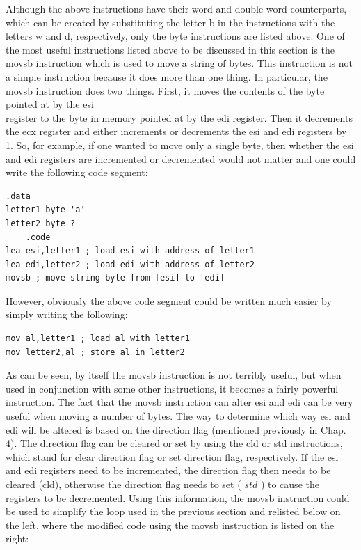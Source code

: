 \documentclass[10pt]{book}
\begin{document}
Although the above instructions have their word and double word counterparts, which can be created by substituting the letter b in the instructions with the letters w and d, respectively, only the byte instructions are listed above. One of the most useful instructions listed above to be discussed in this section is the movsb instruction which is used to move a string of bytes. This instruction is not a simple instruction because it does more than one thing. In particular, the movsb instruction does two things. First, it moves the contents of the byte pointed at by the esi\\
register to the byte in memory pointed at by the edi register. Then it decrements the ecx register and either increments or decrements the esi and edi registers by 1. So, for example, if one wanted to move only a single byte, then whether the esi and edi registers are incremented or decremented would not matter and one could write the following code segment:


\begin{verbatim}
.data
letter1 byte 'a'
letter2 byte ?
    .code
lea esi,letter1 ; load esi with address of letter1
lea edi,letter2 ; load edi with address of letter2
movsb ; move string byte from [esi] to [edi]
\end{verbatim}

However, obviously the above code segment could be written much easier by simply writing the following:

\begin{verbatim}
mov al,letter1 ; load al with letter1
mov letter2,al ; store al in letter2
\end{verbatim}

As can be seen, by itself the movsb instruction is not terribly useful, but when used in conjunction with some other instructions, it becomes a fairly powerful instruction. The fact that the movsb instruction can alter esi and edi can be very useful when moving a number of bytes. The way to determine which way esi and edi will be altered is based on the direction flag (mentioned previously in Chap. 4). The direction flag can be cleared or set by using the cld or std instructions, which stand for clear direction flag or set direction flag, respectively. If the esi and edi registers need to be incremented, the direction flag then needs to be cleared (cld), otherwise the direction flag needs to set ( $s t d$ ) to cause the registers to be decremented. Using this information, the movsb instruction could be used to simplify the loop used in the previous section and relisted below on the left, where the modified code using the movsb instruction is listed on the right:
\end{document}
